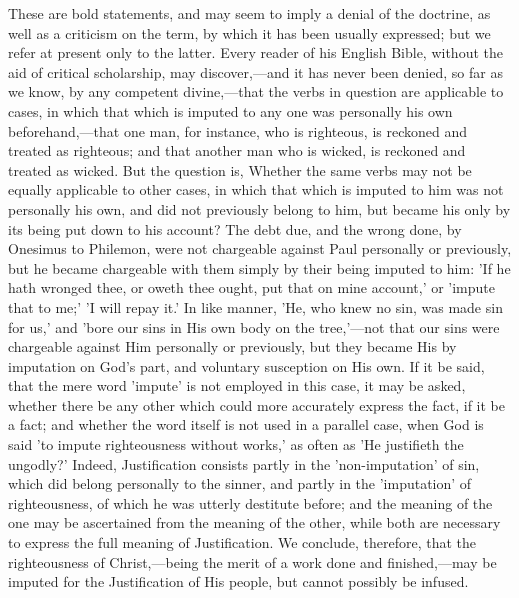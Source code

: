 \documentclass[
]{book}
\begin{document}
These are bold statements, and may seem to imply a denial of the doctrine, as well as a criticism on the term, by which it has been usually expressed; but we refer at present only to the latter. Every reader of his English Bible, without the aid of critical scholarship, may discover,---and it has never been denied, so far as we know, by any competent divine,---that the verbs in question are applicable to cases, in which that which is imputed to any one was personally his own beforehand,---that one man, for instance, who is righteous, is reckoned and treated as righteous; and that another man who is wicked, is reckoned and treated as wicked. But the question is, Whether the same verbs may not be equally applicable to other cases, in which that which is imputed to him was not personally his own, and did not previously belong to him, but became his only by its being put down to his account? The debt due, and the wrong done, by Onesimus to Philemon, were not chargeable against Paul personally or previously, but he became chargeable with them simply by their being imputed to him: 'If he hath wronged thee, or oweth thee ought, put that on mine account,' or 'impute that to me;' 'I will repay it.' In like manner, 'He, who knew no sin, was made sin for us,' and 'bore our sins in His own body on the tree,'---not that our sins were chargeable against Him personally or previously, but they became His by imputation on God's part, and voluntary susception on His own. If it be said, that the mere word 'impute' is not employed in this case, it may be asked, whether there be any other which could more accurately express the fact, if it be a fact; and whether the word itself is not used in a parallel case, when God is said 'to impute righteousness without works,' as often as 'He justifieth the ungodly?' Indeed, Justification consists partly in the 'non-imputation' of sin, which did belong personally to the sinner, and partly in the 'imputation' of righteousness, of which he was utterly destitute before; and the meaning of the one may be ascertained from the meaning of the other, while both are necessary to express the full meaning of Justification. We conclude, therefore, that the righteousness of Christ,---being the merit of a work done and finished,---may be imputed for the Justification of His people, but cannot possibly be infused.
\end{document}
